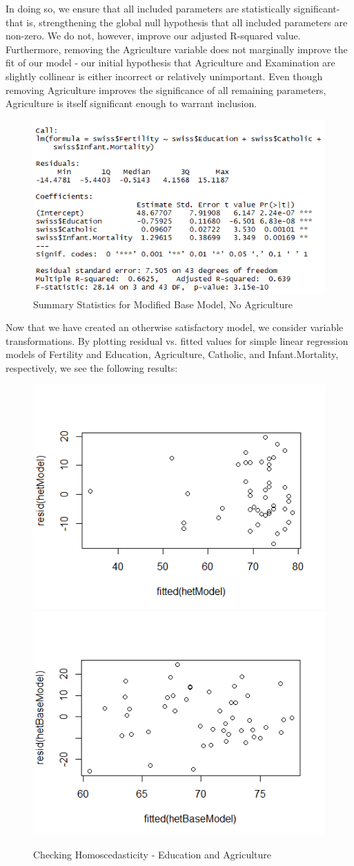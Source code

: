 \documentclass[preprint,12pt]{elsarticle}
\begin{document}
\noindent In doing so, we ensure that all included parameters are statistically significant- that is, strengthening the global null hypothesis that all included parameters are non-zero. We do not, however, improve our adjusted R-squared value. Furthermore, removing the Agriculture variable does not marginally improve the fit of our model - our initial hypothesis that Agriculture and Examination are slightly collinear is either incorrect or relatively unimportant. Even though removing Agriculture improves the significance of all remaining parameters, Agriculture is itself significant enough to warrant inclusion. \\

\begin{figure}[h!]
\centering\includegraphics[width=0.7\linewidth]{SummaryStatsNoAgEx}
\caption{Summary Statistics for Modified Base Model, No Agriculture}
\end{figure}

\noindent Now that we have created an otherwise satisfactory model, we consider variable transformations. By plotting residual vs. fitted values for simple linear regression models of Fertility and Education, Agriculture, Catholic, and Infant.Mortality, respectively, we see the following results:

\begin{figure}[htp]
\includegraphics[width=.5\textwidth]{homoFertEdu}\hfill
\includegraphics[width=.5\textwidth]{homoFertAg}
\caption{Checking Homoscedasticity - Education and Agriculture}
\end{figure}
\end{document}
